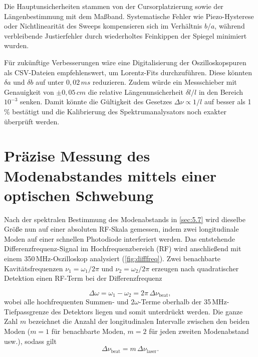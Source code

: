Die Hauptunsicherheiten stammen von der Cursorplatzierung sowie der Längenbestimmung mit dem Maßband. 
Systematische Fehler wie Piezo-Hysterese oder Nichtlinearität des Sweeps kompensieren sich im Verhältnis \(b/a\), während verbleibende Justierfehler durch wiederholtes Feinkippen der Spiegel minimiert wurden.

Für zukünftige Verbesserungen wäre eine Digitalisierung der Oszilloskopspuren als CSV-Dateien empfehlenswert, um Lorentz-Fits durchzuführen. 
Diese könnten \(\delta a\) und \(\delta b\) auf unter \(0{,}02\,\si{ms}\) reduzieren. Zudem würde ein Messschieber mit Genauigkeit von \(\pm 0{,}05\,\si{cm}\) die relative Längenunsicherheit \(\delta l / l\) in den Bereich \(10^{-3}\) senken. 
Damit könnte die Gültigkeit des Gesetzes \(\Delta\nu \propto 1/l\) auf besser als 1\,\% bestätigt und die Kalibrierung des Spektrumanalysators noch exakter überprüft werden.

\chapter{ Präzise Messung des Modenabstandes mittels einer
optischen Schwebung} \label{sec:5.8}

Nach der spektralen Bestimmung des Modenabstands in \cref{sec:5.7} wird dieselbe Größe nun auf einer absoluten RF-Skala gemessen, indem zwei longitudinale Moden auf einer schnellen Photodiode interferiert werden. 
Das entstehende Differenzfrequenz-Signal im Hochfrequenzbereich (RF) wird anschließend mit einem 350\,MHz-Oszilloskop analysiert (\cref{fig:difffreq}). 
Zwei benachbarte Kavitätsfrequenzen $\nu_{1} = \omega_{1}/2\pi$ und $\nu_{2} = \omega_{2}/2\pi$ erzeugen nach quadratischer Detektion einen RF-Term bei der Differenzfrequenz


\begin{equation*}
  \Delta\omega = \omega_{1} - \omega_{2} = 2\pi\,\Delta\nu_{\mathrm{beat}},
\end{equation*}
wobei alle hochfrequenten Summen- und $2\omega$-Terme oberhalb der 35\,MHz-Tiefpassgrenze des Detektors liegen und somit unterdrückt werden. 
Die ganze Zahl $m$ bezeichnet die Anzahl der longitudinalen Intervalle zwischen den beiden Moden ($m=1$ für benachbarte Moden, $m=2$ für jeden zweiten Modenabstand usw.), sodass gilt
\begin{equation}
  \Delta\nu_{\mathrm{beat}} = m\,\Delta\nu_{\mathrm{laser}}.
\end{equation}

